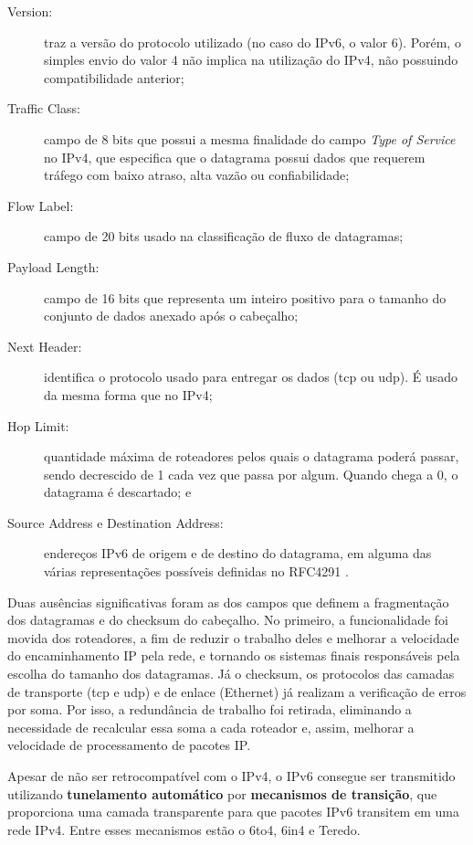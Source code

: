 \begin{description}
    \item[Version:] traz a versão do protocolo utilizado (no caso do IPv6, o valor 6).
        Porém, o simples envio do valor 4 não implica na utilização do IPv4, não
        possuindo compatibilidade anterior;

    \item[Traffic Class:] campo de 8 bits que possui a mesma finalidade do campo
        \emph{Type of Service} no IPv4, que especifica que o datagrama possui dados que
        requerem tráfego com baixo atraso, alta vazão ou confiabilidade;

    \item[Flow Label:] campo de 20 bits usado na classificação de fluxo de datagramas;

    \item[Payload Length:] campo de 16 bits que representa um inteiro positivo para o
        tamanho do conjunto de dados anexado após o cabeçalho;

    \item[Next Header:] identifica o protocolo usado para entregar os dados (\gls{tcp}
        ou \gls*{udp}). É usado da mesma forma que no IPv4;

    \item[Hop Limit:] quantidade máxima de roteadores pelos quais o datagrama poderá
        passar, sendo decrescido de 1 cada vez que passa por algum. Quando chega a 0, o
        datagrama é descartado; e

    \item[Source Address e Destination Address:] endereços IPv6 de origem e de destino
        do datagrama, em alguma das várias representações possíveis definidas no RFC4291
        \cite{site:rfcipv6add}.
\end{description}

Duas ausências significativas foram as dos campos que definem a fragmentação dos
datagramas e do \gls{checksum} do cabeçalho. No primeiro, a funcionalidade foi movida
dos roteadores, a fim de reduzir o trabalho deles e melhorar a velocidade do
encaminhamento IP pela rede, e tornando os sistemas finais responsáveis pela escolha do
tamanho dos datagramas. Já o \gls*{checksum}, os protocolos das camadas de transporte
(\gls*{tcp} e \gls*{udp}) e de enlace (Ethernet) já realizam a verificação de erros por
soma. Por isso, a redundância de trabalho foi retirada, eliminando a necessidade de
recalcular essa soma a cada roteador e, assim, melhorar a velocidade de processamento de
pacotes IP.

Apesar de não ser retrocompatível com o IPv4, o IPv6 consegue ser transmitido utilizando
\textbf{tunelamento automático} por \textbf{mecanismos de transição}, que proporciona
uma camada transparente para que pacotes IPv6 transitem em uma rede IPv4. Entre esses
mecanismos estão o 6to4, 6in4 e Teredo.

